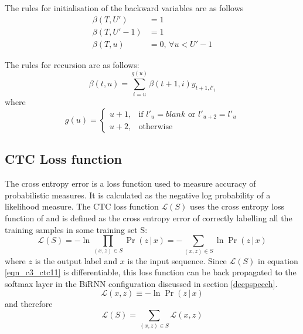 The rules for initialisation of the backward variables are as follows
\begin{equation} \begin{aligned}
\beta(T, U') &= 1 \\
\beta(T, U' - 1) &= 1 \\
\beta(T, u) &= 0, \, \forall u < U' - 1
\end{aligned}\label{eqn_c3_ctc09}\end{equation}

The rules for recursion are as follows:
\begin{equation}
\beta(t, u) = \sum_{i = u}^{g(u)} \beta(t+1, i) y_{t+1, l'_i}\label{eqn_c3_ctc10}\end{equation}
where
\begin{equation}
g(u) = \begin{cases} u + 1,& \text{if } l'_u = blank \text{ or } l'_{u+2} = l'_{u} \\ u + 2,& \text{otherwise} \end{cases}   
\end{equation}

\subsection{CTC Loss function}

The cross entropy error is a loss function used to measure accuracy of probabilistic measures.  It is calculated as the negative log probability of a likelihood measure.  The CTC loss function $\mathcal{L}(S)$ uses the cross entropy loss function of and is defined as the cross entropy error of correctly labelling all the training samples in some training set S:
\begin{equation}
\mathcal{L}(S) = - \ln \prod_{(x,z) \in S} \Pr(z \, | \, x) = - \sum_{(x,z) \in S} \ln \Pr(z \, | \, x)
\label{eqn_c3_ctc11}\end{equation}
where $z$ is the output label and $x$ is the input sequence.  Since $\mathcal{L}(S)$ in equation \ref{eqn_c3_ctc11} is differentiable, this loss function can be back propagated to the softmax layer in the BiRNN configuration discussed in section \ref{deepspeech}.
\begin{equation}
\mathcal{L}(x,z) \equiv - \ln \Pr(z \, | \, x)
\label{eqn_c3_ctc12}\end{equation}
and therefore 
\begin{equation}
\mathcal{L}(S) = \sum_{(x,z) \in S} \mathcal{L}(x,z)
\label{eqn_c3_ctc12}\end{equation}

